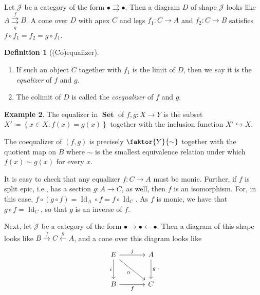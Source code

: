 \documentclass[10pt,letterpaper,cm]{nupset}
\theoremstyle{definition}
\newtheorem{definition}{Definition}[section]
\newtheorem{exmp}[definition]{Example}
\theoremstyle{theorem}
\theoremstyle{remark}
\newcommand{\1}{\mathbf{1}}
\renewcommand{\j}{\mathscr{J}}
\newcommand{\0}{\vec 0}
\DeclareMathOperator{\id}{Id}
\DeclareMathOperator{\set}{\mathbf{Set}}
\begin{document}
\medskip

Let $\j$ be a category of the form $\bullet \rightrightarrows \bullet$. Then  a diagram $D$ of shape $\j$ looks like $A \overset{f}{\underset{g}{\rightrightarrows}} B$. A cone over $D$ with apex $C$ and legs $f_1 : C \to A$ and $f_2 : C \to B$ satisfies $f\circ f_1=f_2 = g\circ f_1$.

\begin{definition}[(Co)equalizer] $ $
\begin{enumerate}
\item If such an object $C$ together with $f_1$ is the limit of $D$, then we say it is the \textit{equalizer} of $f$ and $g$. 
\item The colimit of $D$ is called the \textit{coequalizer} of $f$ and $g$.
\end{enumerate}
\end{definition}

\begin{exmp}\label{set}
The equalizer in $\set$ of $f, g: X \to Y$ is the subset $X'\coloneqq \left\{x \in X : f(x) = g(x)\right\}$ together with the inclusion function $X' \hookrightarrow X$. 

The coequalizer of $\left(f, g\right)$ is precisely $\faktor{Y}{\sim}$ together with the quotient map on $B$ where $\sim$ is the smallest equivalence relation under which $f(x) \sim g(x)$ for every $x$.
\end{exmp}

\smallskip

It is easy to check that any equalizer $f: C \to A$ must be monic. Further, if $f$ is split epic, i.e., has a section $g: A \to C$, as well, then $f$ is an isomorphism. For, in this case, $f\circ \left(g \circ f\right) = \id_A \circ f = f \circ \id_C$. As $f$ is monic, we have that $g \circ f= \id_C$, so that $g$ is an inverse of $f$.

\medskip

Next, let $\j$ be a category of the form $\bullet \rightarrow \bullet \leftarrow \bullet$. Then a diagram of this shape looks like $B \overset{f}{\longrightarrow} C \overset{g}{\longleftarrow} A$, and a cone over this diagram looks like 
\[
\begin{tikzcd}[row sep=large, column sep=large]
E \arrow[to=Z, "i ", swap] \arrow[to=2-2, dr, "\alpha", swap]
& A \arrow[to=2-2, "g "] \\
|[alias=Z]| B  \arrow[to=2-2, "f"'] 
& C
\arrow[from=ul, to=1-2, "j "]
\end{tikzcd}.
\]
\end{document}

